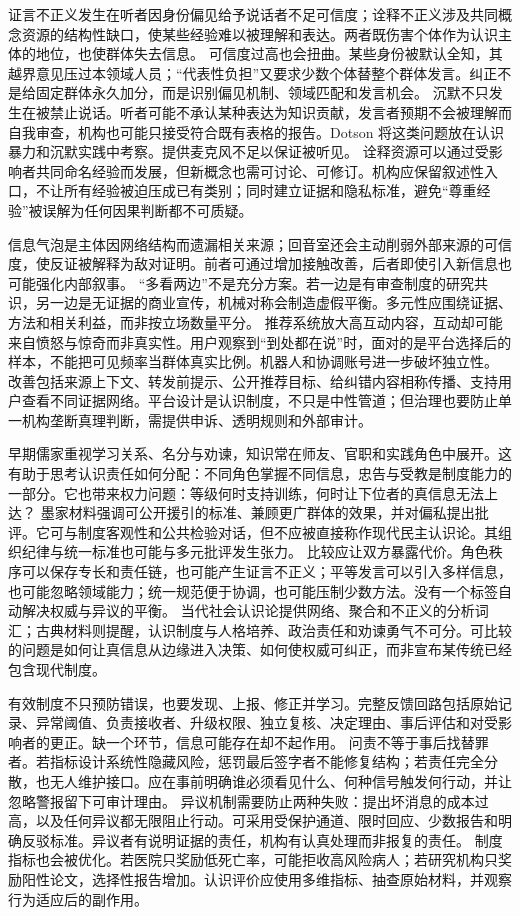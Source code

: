 证言不正义发生在听者因身份偏见给予说话者不足可信度；诠释不正义涉及共同概念资源的结构性缺口，使某些经验难以被理解和表达\parencite{fricker2007}。两者既伤害个体作为认识主体的地位，也使群体失去信息。 可信度过高也会扭曲。某些身份被默认全知，其越界意见压过本领域人员；“代表性负担”又要求少数个体替整个群体发言。纠正不是给固定群体永久加分，而是识别偏见机制、领域匹配和发言机会。 沉默不只发生在被禁止说话。听者可能不承认某种表达为知识贡献，发言者预期不会被理解而自我审查，机构也可能只接受符合既有表格的报告。Dotson 将这类问题放在认识暴力和沉默实践中考察\parencite{dotson2011}。提供麦克风不足以保证被听见。 诠释资源可以通过受影响者共同命名经验而发展，但新概念也需可讨论、可修订。机构应保留叙述性入口，不让所有经验被迫压成已有类别；同时建立证据和隐私标准，避免“尊重经验”被误解为任何因果判断都不可质疑。

信息气泡是主体因网络结构而遗漏相关来源；回音室还会主动削弱外部来源的可信度，使反证被解释为敌对证明。前者可通过增加接触改善，后者即使引入新信息也可能强化内部叙事。 “多看两边”不是充分方案。若一边是有审查制度的研究共识，另一边是无证据的商业宣传，机械对称会制造虚假平衡。多元性应围绕证据、方法和相关利益，而非按立场数量平分。 推荐系统放大高互动内容，互动却可能来自愤怒与惊奇而非真实性。用户观察到“到处都在说”时，面对的是平台选择后的样本，不能把可见频率当群体真实比例。机器人和协调账号进一步破坏独立性。 改善包括来源上下文、转发前提示、公开推荐目标、给纠错内容相称传播、支持用户查看不同证据网络。平台设计是认识制度，不只是中性管道；但治理也要防止单一机构垄断真理判断，需提供申诉、透明规则和外部审计。

早期儒家重视学习关系、名分与劝谏，知识常在师友、官职和实践角色中展开\parencite{analects2003}。这有助于思考认识责任如何分配：不同角色掌握不同信息，忠告与受教是制度能力的一部分。它也带来权力问题：等级何时支持训练，何时让下位者的真信息无法上达？ 墨家材料强调可公开援引的标准、兼顾更广群体的效果，并对偏私提出批评\parencite{graham1989}。它可与制度客观性和公共检验对话，但不应被直接称作现代民主认识论。其组织纪律与统一标准也可能与多元批评发生张力。 比较应让双方暴露代价。角色秩序可以保存专长和责任链，也可能产生证言不正义；平等发言可以引入多样信息，也可能忽略领域能力；统一规范便于协调，也可能压制少数方法。没有一个标签自动解决权威与异议的平衡。 当代社会认识论提供网络、聚合和不正义的分析词汇；古典材料则提醒，认识制度与人格培养、政治责任和劝谏勇气不可分。可比较的问题是如何让真信息从边缘进入决策、如何使权威可纠正，而非宣布某传统已经包含现代制度。

有效制度不只预防错误，也要发现、上报、修正并学习。完整反馈回路包括原始记录、异常阈值、负责接收者、升级权限、独立复核、决定理由、事后评估和对受影响者的更正。缺一个环节，信息可能存在却不起作用。 问责不等于事后找替罪者。若指标设计系统性隐藏风险，惩罚最后签字者不能修复结构；若责任完全分散，也无人维护接口。应在事前明确谁必须看见什么、何种信号触发何行动，并让忽略警报留下可审计理由。 异议机制需要防止两种失败：提出坏消息的成本过高，以及任何异议都无限阻止行动。可采用受保护通道、限时回应、少数报告和明确反驳标准。异议者有说明证据的责任，机构有认真处理而非报复的责任。 制度指标也会被优化。若医院只奖励低死亡率，可能拒收高风险病人；若研究机构只奖励阳性论文，选择性报告增加。认识评价应使用多维指标、抽查原始材料，并观察行为适应后的副作用。

